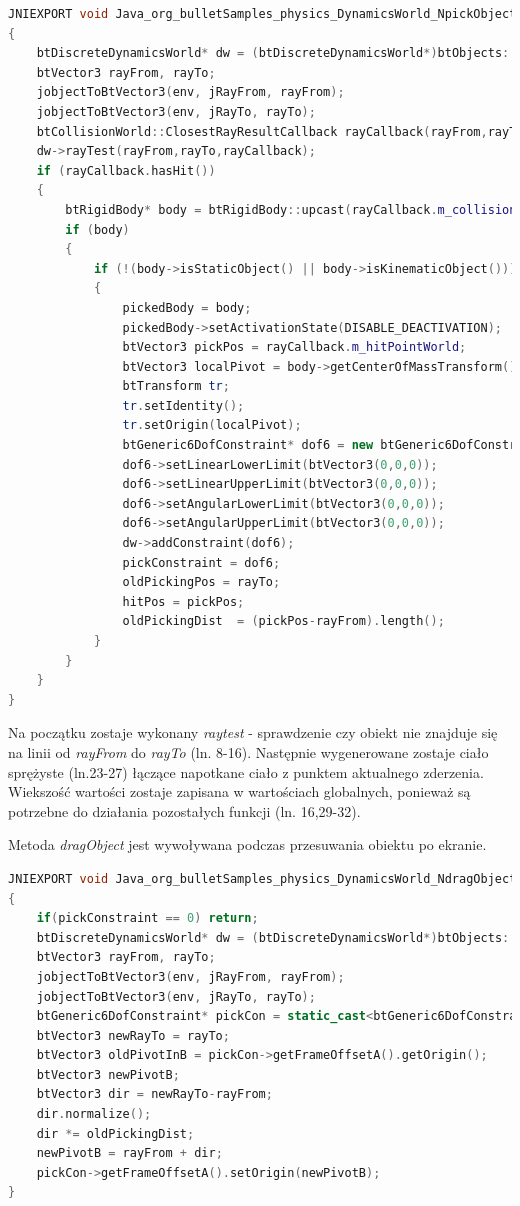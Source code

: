 \begin{lstlisting}[language=c++, caption=Implementacja
metody pickObject,label=lis:pickObject]
JNIEXPORT void Java_org_bulletSamples_physics_DynamicsWorld_NpickObject( JNIEnv* env, jobject self, jint id, jobject jRayFrom, jobject jRayTo )
{
	btDiscreteDynamicsWorld* dw = (btDiscreteDynamicsWorld*)btObjects::get(id);
	btVector3 rayFrom, rayTo;
	jobjectToBtVector3(env, jRayFrom, rayFrom);
	jobjectToBtVector3(env, jRayTo, rayTo);
	btCollisionWorld::ClosestRayResultCallback rayCallback(rayFrom,rayTo);
	dw->rayTest(rayFrom,rayTo,rayCallback);
	if (rayCallback.hasHit())
	{
		btRigidBody* body = btRigidBody::upcast(rayCallback.m_collisionObject);
		if (body)
		{
			if (!(body->isStaticObject() || body->isKinematicObject()))
			{
				pickedBody = body;
				pickedBody->setActivationState(DISABLE_DEACTIVATION);
				btVector3 pickPos = rayCallback.m_hitPointWorld;
				btVector3 localPivot = body->getCenterOfMassTransform().inverse() * pickPos;
				btTransform tr;
				tr.setIdentity();
				tr.setOrigin(localPivot);
				btGeneric6DofConstraint* dof6 = new btGeneric6DofConstraint(*body, tr,false);
				dof6->setLinearLowerLimit(btVector3(0,0,0));
				dof6->setLinearUpperLimit(btVector3(0,0,0));
				dof6->setAngularLowerLimit(btVector3(0,0,0));
				dof6->setAngularUpperLimit(btVector3(0,0,0));
				dw->addConstraint(dof6);
				pickConstraint = dof6;
				oldPickingPos = rayTo;
				hitPos = pickPos;
				oldPickingDist  = (pickPos-rayFrom).length();
			}
		}
	}
}
\end{lstlisting}

Na początku zostaje wykonany \emph{raytest} - sprawdzenie czy obiekt nie
znajduje się na linii od \emph{rayFrom} do \emph{rayTo} (ln. 8-16). Następnie
wygenerowane zostaje ciało sprężyste (ln.23-27) łączące napotkane ciało z
punktem aktualnego zderzenia. Wiekszość wartości zostaje zapisana w wartościach
globalnych, ponieważ są potrzebne do działania pozostałych funkcji (ln.
16,29-32).

Metoda \emph{dragObject} jest wywoływana podczas przesuwania obiektu po
ekranie.

\begin{lstlisting}[language=c++, caption=Implementacja
metody dragObject,label=lis:dragObject]
JNIEXPORT void Java_org_bulletSamples_physics_DynamicsWorld_NdragObject( JNIEnv* env, jobject self, jint id, jobject jRayFrom, jobject jRayTo )
{
	if(pickConstraint == 0) return;
	btDiscreteDynamicsWorld* dw = (btDiscreteDynamicsWorld*)btObjects::get(id);
	btVector3 rayFrom, rayTo;
	jobjectToBtVector3(env, jRayFrom, rayFrom);
	jobjectToBtVector3(env, jRayTo, rayTo);
	btGeneric6DofConstraint* pickCon = static_cast<btGeneric6DofConstraint*>(pickConstraint);
	btVector3 newRayTo = rayTo;
	btVector3 oldPivotInB = pickCon->getFrameOffsetA().getOrigin();
	btVector3 newPivotB;
	btVector3 dir = newRayTo-rayFrom;
	dir.normalize();
	dir *= oldPickingDist;
	newPivotB = rayFrom + dir;
	pickCon->getFrameOffsetA().setOrigin(newPivotB);
}
\end{lstlisting}

